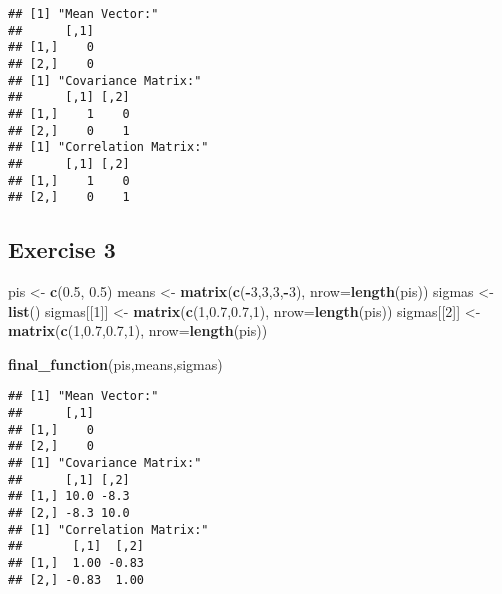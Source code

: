 \documentclass[]{article}
\newenvironment{Shaded}{\begin{snugshade}}{\end{snugshade}}
\newcommand{\DataTypeTok}[1]{\textcolor[rgb]{0.13,0.29,0.53}{#1}}
\newcommand{\DecValTok}[1]{\textcolor[rgb]{0.00,0.00,0.81}{#1}}
\newcommand{\FloatTok}[1]{\textcolor[rgb]{0.00,0.00,0.81}{#1}}
\newcommand{\KeywordTok}[1]{\textcolor[rgb]{0.13,0.29,0.53}{\textbf{#1}}}
\newcommand{\NormalTok}[1]{#1}
\newcommand{\OperatorTok}[1]{\textcolor[rgb]{0.81,0.36,0.00}{\textbf{#1}}}
\newcommand{\StringTok}[1]{\textcolor[rgb]{0.31,0.60,0.02}{#1}}
\begin{document}
\begin{verbatim}
## [1] "Mean Vector:"
##      [,1]
## [1,]    0
## [2,]    0
## [1] "Covariance Matrix:"
##      [,1] [,2]
## [1,]    1    0
## [2,]    0    1
## [1] "Correlation Matrix:"
##      [,1] [,2]
## [1,]    1    0
## [2,]    0    1
\end{verbatim}

\hypertarget{exercise-3}{%
\subsection{Exercise 3}\label{exercise-3}}

\begin{Shaded}
\begin{Highlighting}[]
\NormalTok{pis <-}\StringTok{ }\KeywordTok{c}\NormalTok{(}\FloatTok{0.5}\NormalTok{, }\FloatTok{0.5}\NormalTok{)}
\NormalTok{means <-}\StringTok{ }\KeywordTok{matrix}\NormalTok{(}\KeywordTok{c}\NormalTok{(}\OperatorTok{-}\DecValTok{3}\NormalTok{,}\DecValTok{3}\NormalTok{,}\DecValTok{3}\NormalTok{,}\OperatorTok{-}\DecValTok{3}\NormalTok{), }\DataTypeTok{nrow=}\KeywordTok{length}\NormalTok{(pis))}
\NormalTok{sigmas <-}\StringTok{ }\KeywordTok{list}\NormalTok{()}
\NormalTok{sigmas[[}\DecValTok{1}\NormalTok{]] <-}\StringTok{ }\KeywordTok{matrix}\NormalTok{(}\KeywordTok{c}\NormalTok{(}\DecValTok{1}\NormalTok{,}\FloatTok{0.7}\NormalTok{,}\FloatTok{0.7}\NormalTok{,}\DecValTok{1}\NormalTok{), }\DataTypeTok{nrow=}\KeywordTok{length}\NormalTok{(pis))}
\NormalTok{sigmas[[}\DecValTok{2}\NormalTok{]] <-}\StringTok{ }\KeywordTok{matrix}\NormalTok{(}\KeywordTok{c}\NormalTok{(}\DecValTok{1}\NormalTok{,}\FloatTok{0.7}\NormalTok{,}\FloatTok{0.7}\NormalTok{,}\DecValTok{1}\NormalTok{), }\DataTypeTok{nrow=}\KeywordTok{length}\NormalTok{(pis))}
\end{Highlighting}
\end{Shaded}

\begin{Shaded}
\begin{Highlighting}[]
\KeywordTok{final_function}\NormalTok{(pis,means,sigmas)}
\end{Highlighting}
\end{Shaded}

\begin{verbatim}
## [1] "Mean Vector:"
##      [,1]
## [1,]    0
## [2,]    0
## [1] "Covariance Matrix:"
##      [,1] [,2]
## [1,] 10.0 -8.3
## [2,] -8.3 10.0
## [1] "Correlation Matrix:"
##       [,1]  [,2]
## [1,]  1.00 -0.83
## [2,] -0.83  1.00
\end{verbatim}
\end{document}
